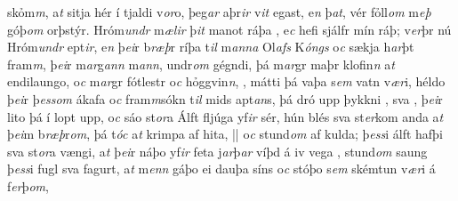 skỏm\textit{m}, a\textit{t} sitja hér í tjaldi v\textit{or}o, þeg\textit{ar}
aþr\textit{ir} v\textit{it} egast, e\textit{n} þ\textit{at}, 
 vér fỏll\textit{om} m\textit{eþ} góþ\textit{om} orþstýr. 
Hróm\textit{undr} m\textit{ælir} þ\textit{it} manot ráþa  , e\textit{c} hefi sjálfr mín ráþ;  v\textit{er}þr nú
Hróm\textit{undr} ept\textit{ir}, e\textit{n} þ\textit{ei}r b\textit{ræþ}r   ríþa t\textit{il} m\textit{anna} Ol\textit{afs} K\textit{óngs} o\textit{c} sækja   h\textit{ar}þt fram\textit{m},   þ\textit{ei}r   m\textit{ar}g\textit{an}\textit{n} m\textit{an}\textit{n},   undr\textit{om} gégndi,   þá m\textit{ar}gr maþr  klofin\textit{n} a\textit{t}  endilaungo, 
o\textit{c} m\textit{ar}gr fótlestr o\textit{c}  hỏggvin\textit{n},  , mátti þá vaþa    s\textit{em} vatn v\textit{ær}i, héldo þ\textit{ei}r
þ\textit{ess}\textit{om} ákafa o\textit{c} fram\textit{m}sókn t\textit{il} mids apt\textit{an}s, þá dró upp þykkni   , sva  , þ\textit{ei}r lito þá í lopt upp, o\textit{c} sáo 
st\textit{or}a Álft fljúga yf\textit{ir} sér, hún blés sva st\textit{er}kom
anda a\textit{t} þ\textit{ei}m b\textit{ræþ}r\textit{om},   þá t\textit{óc} a\textit{t}  krimpa    af hita, 
|| o\textit{c} stund\textit{om} af kulda; þ\textit{ess}i álft hafþi sva
st\textit{or}a vængi,  a\textit{t} þ\textit{ei}r náþo
yf\textit{ir}  feta   j\textit{ar}þ\textit{ar} víþd á iv vega  , stund\textit{om} saung þ\textit{ess}i fugl sva fagurt, a\textit{t}
m\textit{enn} gáþo ei  dauþa síns o\textit{c} stóþo s\textit{em}  skémtun v\textit{ær}i á f\textit{er}þ\textit{om},    
